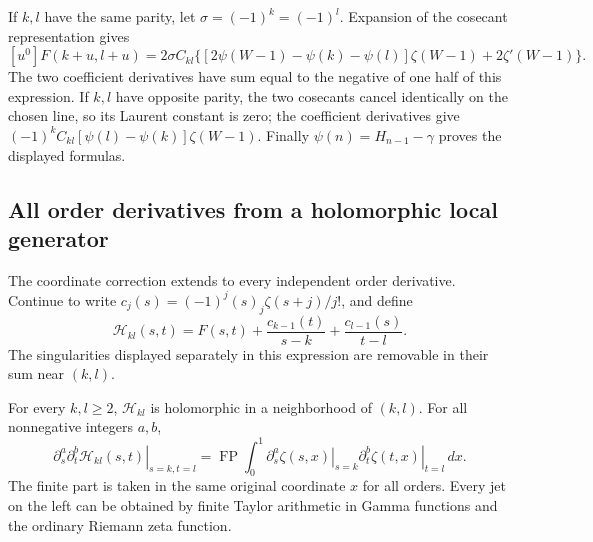 If $k,l$ have the same parity, let $\sigma=(-1)^k=(-1)^l$.
Expansion of the cosecant representation gives
\[
 [u^0]F(k+u,l+u)
 =2\sigma C_{kl}\{[2\psi(W-1)-\psi(k)-\psi(l)]\zeta(W-1)
                   +2\zeta'(W-1)\}.
\]
The two coefficient derivatives have sum equal to the negative of one
half of this expression.  If $k,l$ have opposite parity, the two
cosecants cancel identically on the chosen line, so its Laurent
constant is zero; the coefficient derivatives give
$(-1)^kC_{kl}[\psi(l)-\psi(k)]\zeta(W-1)$.  Finally
$\psi(n)=H_{n-1}-\gamma$ proves the displayed formulas.

\subsection{All order derivatives from a holomorphic local generator}

The coordinate correction extends to every independent order derivative.
Continue to write
$c_j(s)=(-1)^j(s)_j\zeta(s+j)/j!$, and define
\begin{equation}\label{hprod:completed-generator}
 \mathscr H_{kl}(s,t)=F(s,t)
 +\frac{c_{k-1}(t)}{s-k}+\frac{c_{l-1}(s)}{t-l}.
\end{equation}
The singularities displayed separately in this expression are removable
in their sum near $(k,l)$.

\begin{theorem}
\label{hprod:all-jets}
For every $k,l\ge2$, $\mathscr H_{kl}$ is holomorphic in a
neighborhood of $(k,l)$.  For all nonnegative integers $a,b$,
\begin{equation}\label{hprod:jet-fp}
 \left.\partial_s^a\partial_t^b\mathscr H_{kl}(s,t)
 \right|_{s=k,t=l}
 =\operatorname{FP}\int_0^1
 \left.\partial_s^a\zeta(s,x)\right|_{s=k}
 \left.\partial_t^b\zeta(t,x)\right|_{t=l}\,dx.
\end{equation}
The finite part is taken in the same original coordinate $x$ for all
orders.  Every jet on the left can be obtained by finite Taylor
arithmetic in Gamma functions and the ordinary Riemann zeta function.
\end{theorem}

